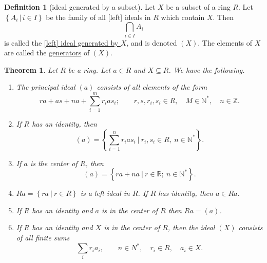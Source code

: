 \documentclass[a4paper,10pt]{scrreprt}
\newcommand{\R}{\mathbb{R}}
\newcommand{\Z}{\mathbb{Z}}
\newcommand{\N}{\mathbb{N}}
\newcommand{\defn}[1]{\ul{#1}}
\theoremstyle{definition}
\newtheorem{definition}{Definition}[section]
\theoremstyle{plain}
\newtheorem{theorem}{Theorem}[section]
\theoremstyle{remark}
\begin{document}
\begin{definition}[ideal generated by a subset]
  \label{def:idealgenerated}
  Let $X$ be a subset of a ring $R$. Let $\left\{ A_{i}\,\big|\, i \in I \right\}$ be the family of all [left] ideals in $R$ which contain $X$. Then 
  \begin{equation*}
    \bigcap_{i \in I} A_{i}
  \end{equation*}
  is called the \defn{[left] ideal generated by $X$}, and is denoted $(X)$. The elements of $X$ are called the \defn{generators} of $(X)$.
\end{definition}
\begin{theorem}
  Let $R$ be a ring. Let $a \in R$ and $X \subseteq R$. We have the following.
  \begin{enumerate}
    \item The principal ideal $(a)$ consists of all elements of the form 
      \begin{equation*}
        ra + as + na  + \sum_{i=1}^{m} r_{i} a s_{i};\qquad r,s,r_{i}, s_{i} \in R,\quad M \in \N^{*},\quad n \in \Z.
      \end{equation*}

    \item If $R$ has an identity, then 
      \begin{equation*}
        (a) = \left\{ \sum_{i=1}^{n} r_{i} a s_{i} \ \biggr|\  r_{i}, s_{i} \in R,\ n \in \N^{*} \right\}.
      \end{equation*}

    \item If $a$ is the center of $R$, then
      \begin{equation*}
        (a) = \left\{ ra + na\ \big|\ r \in \R;\ n \in \N^{*} \right\}.
      \end{equation*}
    \item $Ra = \left\{ ra\ \big|\ r \in R \right\}$ is a left ideal in $R$. If $R$ has identity, then $a \in Ra$.

    \item If $R$ has an identity and $a$ is in the center of $R$ then $Ra = (a)$.
    \item If $R$ has an identity and $X$ is in the center of $R$, then the ideal $(X)$ consists of all finite sums 
      \begin{equation*}
        \sum_{i} r_{i} a_{i},\qquad n \in N^{*},\quad r_{i}\in R,\quad a_{i} \in X.
      \end{equation*}
  \end{enumerate}
\end{theorem}
\end{document}
